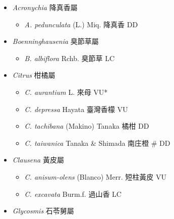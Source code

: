 
  \begin{itemize}
 \item[] \textit{Acronychia} 降真香屬
                                
  \begin{itemize}
        \item[] \textit{A. pedunculata} (L.) Miq.  降真香   DD
  \end{itemize}
 \item[] \textit{Boenninghausenia} 臭節草屬
                                
  \begin{itemize}
        \item[] \textit{B. albiflora} Rchb.  臭節草   LC
  \end{itemize}
 \item[] \textit{Citrus} 柑橘屬
                                
  \begin{itemize}
        \item[] \textit{C. aurantium} L.  來母   VU*
        \item[] \textit{C. depressa} Hayata  臺灣香檬   VU
        \item[] \textit{C. tachibana} (Makino) Tanaka  橘柑   DD
        \item[] \textit{C. taiwanica} Tanaka \& Shimada  南庄橙  \# DD
  \end{itemize}
 \item[] \textit{Clausena} 黃皮屬
                                
  \begin{itemize}
        \item[] \textit{C. anisum-olens} (Blanco) Merr.  短柱黃皮   VU
        \item[] \textit{C. excavata} Burm.f.  過山香   LC
  \end{itemize}
 \item[] \textit{Glycosmis} 石苓舅屬
                                

\end{itemize}
